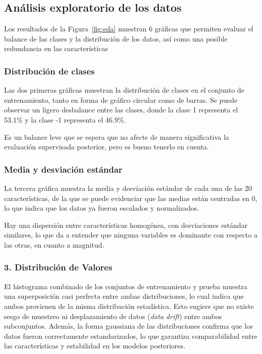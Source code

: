 \documentclass[12pt,a4paper]{article}
\begin{document}
\subsection{Análisis exploratorio de los datos}

Los resultados de la Figura~\ref{fig:eda} muestran 6 gráficas que permiten evaluar el balance de las clases y la distribución de los datos, así como una posible redundancia en las características

\subsubsection{Distribución de clases}

Las dos primeras gráficas muestran la distribución de clases en el conjunto de entrenamiento, tanto en forma de gráfico circular como de barras.
Se puede observar un ligero desbalance entre las clases, donde la clase 1 representa el 53.1\% y la clase -1 representa el 46.9\%.

Es un balance leve que se espera que no afecte de manera significativa la evaluación supervisada posterior, pero es bueno tenerlo en cuenta.

\subsubsection{Media y desviación estándar}

La tercera gráfica muestra la media y desviación estándar de cada una de las 20 características, de la que se puede evidenciar que las medias están centradas en 0, lo que indica que los datos ya fueron escalados y normalizados.

Hay una dispersión entre características homogénea, con desviaciones estándar similares, lo que da a entender que ninguna variables es dominante con respecto a las otras, en cuanto a magnitud.

\subsubsection*{3. Distribución de Valores}

El histograma combinado de los conjuntos de entrenamiento y prueba muestra una superposición casi perfecta entre ambas distribuciones, lo cual indica que ambos provienen de la misma distribución estadística. 
Esto sugiere que no existe sesgo de muestreo ni desplazamiento de datos (\textit{data drift}) entre ambos subconjuntos. 
Además, la forma gaussiana de las distribuciones confirma que los datos fueron correctamente estandarizados, lo que garantiza comparabilidad entre las características y estabilidad en los modelos posteriores.
\end{document}
